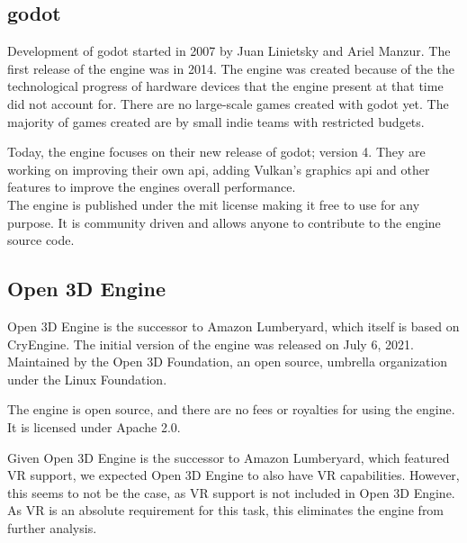 

\subsection{\Gls{godot}}
Development of \Gls{godot} started in 2007 by Juan Linietsky and Ariel Manzur. The first release of the engine was in 2014. The engine was created because of the the technological progress of hardware devices that the engine present at that time did not account for. \cite{waiting_for_vr_2016} There are no large-scale games created with \Gls{godot} yet. The majority of games created are by small indie teams with restricted budgets.

Today, the engine focuses on their new release of \Gls{godot}; version 4. They are working on improving their own \acrshort{api}, adding Vulkan's graphics \acrshort{api} and other features to improve the engines overall performance. \cite{godot_improvements_verschelde_2022} \\

The engine is published under the \acrshort{mit} license making it free to use for any purpose. \cite{godot:licence} It is community driven and allows anyone to contribute to the engine source code. \cite{godot_introduction}

\subsection{Open 3D Engine}

Open 3D Engine is the successor to Amazon Lumberyard, which itself is based on CryEngine. The initial version of the engine was released on July 6, 2021. Maintained by the Open 3D Foundation, an open source, umbrella organization under the Linux Foundation. \cite{open3d_foundation} 

The engine is open source, and there are no fees or royalties for using the engine. It is licensed under Apache 2.0. \cite{open3d_licence}

Given Open 3D Engine is the successor to Amazon Lumberyard, which featured VR support, we expected Open 3D Engine to also have VR capabilities. However, this seems to not be the case, as VR support is not included in Open 3D Engine. As VR is an absolute requirement for this task, this eliminates the engine from further analysis. 


